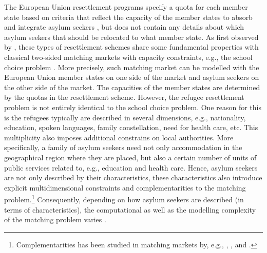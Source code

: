 \documentclass[12pt,fleqn]{article}
\begin{document}
The European Union resettlement programs specify a quota for each member state based on criteria that reflect the capacity of the member states to absorb and integrate asylum seekers \citep[see][for a systematic and critical analysis]{bib:Grech}, but does not contain any details about which asylum seekers that should be relocated to what member state. As first observed by \citet{bib:JonesTeytelboym2016b,bib:JonesTeytelboym2016a}, these types of resettlement schemes share some fundamental properties with classical two-sided matching markets with capacity constraints, e.g., the school choice problem \citep{bib:AbdulkadirougluSonmez}. More precisely, such matching market can be modelled with the European Union member states on one side of the market and asylum seekers on the other side of the market. The capacities of the member states are determined by the quotas in the resettlement scheme. However, the refugee resettlement problem is not entirely identical to the school choice problem. One reason for this is the refugees typically are described in several dimensions, e.g., nationality, education, spoken languages, family constellation, need for health care, etc. This multiplicity also imposes additional constrains on local authorities. More specifically, a family of asylum seekers need not only accommodation in the geographical region where they are placed, but also a certain number of units of public services related to, e.g., education and health care. Hence, asylum seekers are not only described by their characteristics, these characteristics also introduce explicit multidimensional constraints and complementarities to the matching problem.\footnote{Complementarities has been studied in matching markets by, e.g., \citet{bib:HatfieldKominers}, \citet{bib:PathakRoth}, \citet{bib:Pycia} and \citet{bib:RothPeranson}.} Consequently, depending on how asylum seekers are described (in terms of characteristics), the computational as well as the modelling complexity of the matching problem varies \citep{bib:Andersson,bib:BansakEtAl,bib:DelacretazEtAl2016,bib:JonesTeytelboym2016a}.
\end{document}
